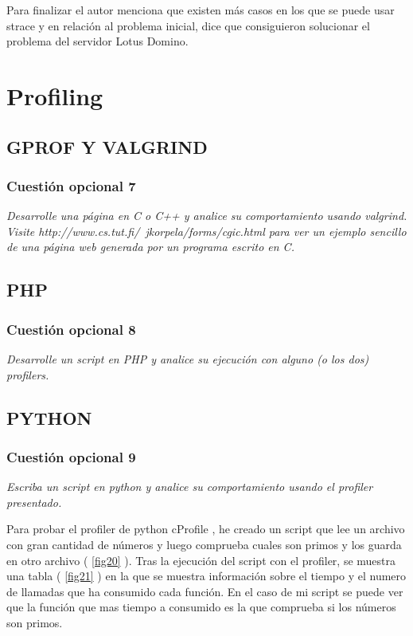 Para finalizar el autor menciona que existen más casos en los que se puede usar strace y en relación al problema inicial, dice que consiguieron solucionar el problema del servidor Lotus Domino.

\section{Profiling}
\subsection{GPROF Y VALGRIND}


\subsubsection{Cuestión opcional 7}
\textit{Desarrolle una página en C o C++ y analice su comportamiento usando valgrind. Visite http://www.cs.tut.fi/~jkorpela/forms/cgic.html para ver un ejemplo sencillo de una página web generada por un programa escrito en C.}
\subsection{PHP}


\subsubsection{Cuestión opcional 8}
\textit{Desarrolle un script en PHP y analice su ejecución con alguno (o los dos) profilers.}


\subsection{PYTHON}
\subsubsection{Cuestión opcional 9}
\textit{Escriba un script en python y analice su comportamiento usando el profiler presentado.}
\newline

Para probar el profiler de python cProfile \cite{cprofile}, he creado un script que lee un archivo con gran cantidad de números y luego comprueba cuales son primos y los guarda en otro archivo ( \cref{fig20} ). Tras la ejecución del script con el profiler, se muestra una tabla ( \cref{fig21} ) en la que se muestra información sobre el tiempo y el numero de llamadas que ha consumido cada función. En el caso de mi script se puede ver que la función que mas tiempo a consumido es la que comprueba si los números son primos.
\newline

